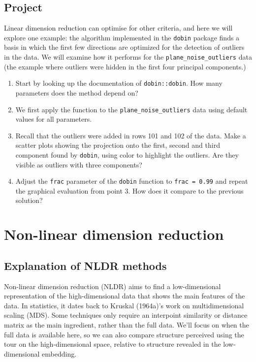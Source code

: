 \documentclass[
  letterpaper,
]{krantz}
\providecommand{\tightlist}{%
  \setlength{\itemsep}{0pt}\setlength{\parskip}{0pt}}\usepackage{longtable,booktabs,array}
\begin{document}
\section*{Project}\label{project}


Linear dimension reduction can optimise for other criteria, and here we
will explore one example: the algorithm implemented in the
\texttt{dobin} package finds a basis in which the first few directions
are optimized for the detection of outliers in the data. We will examine
how it performs for the \texttt{plane\_noise\_outliers} data (the
example where outliers were hidden in the first four principal
components.)

\begin{enumerate}
\def\labelenumi{\arabic{enumi}.}
\tightlist
\item
  Start by looking up the documentation of \texttt{dobin::dobin}. How
  many parameters does the method depend on?
\item
  We first apply the function to the \texttt{plane\_noise\_outliers}
  data using default values for all parameters.
\item
  Recall that the outliers were added in rows 101 and 102 of the data.
  Make a scatter plots showing the projection onto the first, second and
  third component found by \texttt{dobin}, using color to highlight the
  outliers. Are they visible as outliers with three components?
\item
  Adjust the \texttt{frac} parameter of the \texttt{dobin} function to
  \texttt{frac\ =\ 0.99} and repeat the graphical evaluation from point
  3. How does it compare to the previous solution?
\end{enumerate}


\chapter{Non-linear dimension
reduction}\label{non-linear-dimension-reduction}

\section{Explanation of NLDR methods}\label{explanation-of-nldr-methods}

Non-linear dimension reduction (NLDR) aims to find a low-dimensional
representation of the high-dimensional data that shows the main features
of the data. In statistics, it dates back to Kruskal (1964a)'s work on
multidimensional scaling (MDS). Some techniques only require an
interpoint similarity or distance matrix as the main ingredient, rather
than the full data. We'll focus on when the full data is available here,
so we can also compare structure perceived using the tour on the
high-dimensional space, relative to structure revealed in the
low-dimensional embedding.
\end{document}
